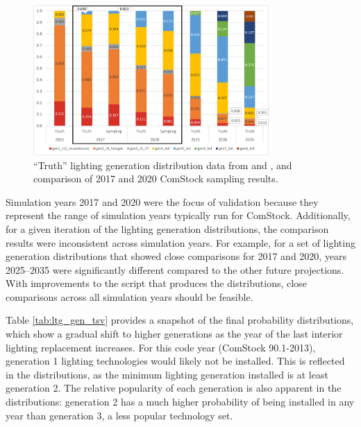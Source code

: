 \begin{figure} [b!]
    \centering \includegraphics[width=0.8\textwidth]{figures/ltg_truth_vs_sampling.png}
    \caption[Interior lighting generation distributions]{``Truth'' lighting generation distribution data from \cite{doe2015lmc} and \cite{doe2019ssl}, and comparison of 2017 and 2020 ComStock sampling results.}
    \label{fig:ltg_compare_dist}
\end{figure}

Simulation years 2017 and 2020 were the focus of validation because they represent the range of simulation years typically run for ComStock. Additionally, for a given iteration of the lighting generation distributions, the comparison results were inconsistent across simulation years. For example, for a set of lighting generation distributions that showed close comparisons for 2017 and 2020, years 2025--2035 were significantly different compared to the other future projections.  With improvements to the script that produces the distributions, close comparisons across all simulation years should be feasible.

Table \ref{tab:ltg_gen_tsv} provides a snapshot of the final probability distributions, which show a gradual shift to higher generations as the year of the last interior lighting replacement increases. For this code year (ComStock 90.1-2013), generation 1 lighting technologies would likely not be installed. This is reflected in the distributions, as the minimum lighting generation installed is at least generation 2.  The relative popularity of each generation is also apparent in the distributions: generation 2 has a much higher probability of being installed in any year than generation 3, a less popular technology set.

\pagebreak

